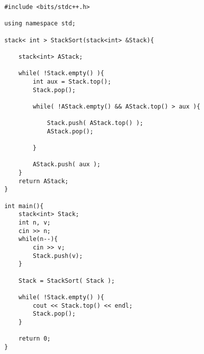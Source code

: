 \begin{lstlisting}
    #include <bits/stdc++.h>

    using namespace std;

    stack< int > StackSort(stack<int> &Stack){

        stack<int> AStack;
        
        while( !Stack.empty() ){
            int aux = Stack.top();
            Stack.pop();
            
            while( !AStack.empty() && AStack.top() > aux ){
    
                Stack.push( AStack.top() );
                AStack.pop();    

            }

            AStack.push( aux );
        }
        return AStack;
    }

    int main(){
        stack<int> Stack;
        int n, v;
        cin >> n;
        while(n--){
            cin >> v;
            Stack.push(v); 
        } 

        Stack = StackSort( Stack );

        while( !Stack.empty() ){
            cout << Stack.top() << endl;
            Stack.pop();
        }

        return 0;
    }
\end{lstlisting}